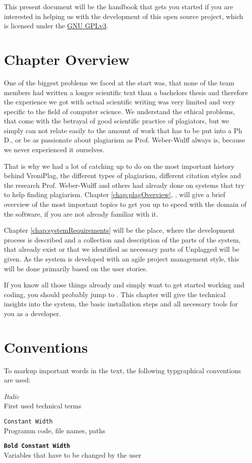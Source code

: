 This present document will be the handbook that gets you started if you are interested in helping us with the development of this 
open source project, which is licensed under the \href{http://www.gnu.org/licenses/quick-guide-gplv3}{GNU GPLv3}.

\section*{Chapter Overview}

One of the biggest problems we faced at the start was, that none of the team members had written a longer scientific
text than a bachelors
thesis and therefore the experience we got with actual scientific writing was very limited and very specific to the 
field of computer science. We understand the ethical problems, that come with the betrayal of 
good scientific practice of plagiators, but we simply can not relate easily to the amount of work that has to be put into 
a Ph D., or be as 
passionate about plagiarism as Prof. Weber-Wulff always is, because we never experienced it ourselves.

That is why we had a lot of catching up to do on the most important history behind VroniPlag, the different types
of plagiarism, different citation styles and the research Prof. Weber-Wulff and others had already done on systems that try to 
help finding plagiarism. Chapter \ref{chap:plagOverview}, , will
give a brief overview of the most important topics to get you up to speed with the domain of the software, if you are
not already familiar with it.

Chapter \ref{chap:systemRequirements} will be the place, where the development process is described and a collection and description 
of the parts of the system, that already exist or that we identified as 
necessary parts of Unplagged will be given. As the system is developed with an agile project management style, this will be done
primarily based on the user stories.

If you know all those things already and simply want to get started working and coding, you should probably jump
to . This chapter will give the technical insights into the system, the basic installation
steps and all necessary tools for you as a developer.

\section*{Conventions}

To markup important words in the text, the following typgraphical conventions are used:

\begin{description}
\item \textit{Italic} \hfill \\
  First used technical terms
\item \texttt{Constant Width} \hfill \\
  Programm code, file names, paths
\item \textbf{\texttt{Bold Constant Width}} \hfill \\
  Variables that have to be changed by the user
\end{description}
